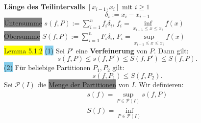 \documentclass[landscape, 10pt]{article}
\begin{document}
\begin{multicols}{3}
              \textbf{Länge des Teilintervalls} 
                     \textcolor{NavyBlue}{
                     $[x_{i-1},x_i]$} mit
                     \textcolor{NavyBlue}{
                     $i\geqslant1$}
                     \begin{equation*}
                            \delta_i:=x_i-x_{i-1}
                     \end{equation*}
              \colorbox{gray}{Untersumme} 
                     \textcolor{NavyBlue}{
                     $s(f,P):=\sum_{i=1}^nf_i\delta_i,\,
                     f_i=\inf\limits_{x_{i-1}
                     \leqslant x\leqslant x_i}f(x)$}\\ 
              \colorbox{gray}{Obersumme} 
                     \textcolor{NavyBlue}{$S(f,P)
                     :=\sum_{i=1}^nF_i\delta_i,\, 
                     F_i=\sup\limits_{x_{i-1}
                     \leqslant x\leqslant x_i}f(x)$}\\
              \colorbox{yellow}{Lemma 5.1.2} 
                     \colorbox{SkyBlue}{(1)} 
                            Sei \textcolor{NavyBlue}{$P'$}
                            eine \textbf{Verfeinerung} von 
                            \textcolor{NavyBlue}{$P$}. 
                            Dann gilt: 
                            \begin{equation*}
                                   s(f,P)\leqslant s(f,P')
                                   \leqslant S(f,P')
                                   \leqslant S(f,P).
                            \end{equation*}
                     \colorbox{SkyBlue}{(2)} 
                            Für beliebige Partitionen 
                            \textcolor{NavyBlue}{$P_1,P_2$}
                            gilt: 
                            \begin{equation*}
                                   s(f,P_1)
                                   \leqslant S(f,P_2).
                            \end{equation*}
              Sei \textcolor{NavyBlue}{$\mathcal{P}(I)$} 
                     die \colorbox{gray}{Menge der Partitionen} 
                     von \textcolor{NavyBlue}{$I$}. 
                     Wir definieren: 
                     \begin{align*}
                            s(f)=\sup
                            \limits_{P\in\mathcal{P}(I)}
                            s(f,P)\\
                            S(f)=\inf
                            \limits_{P\in\mathcal{P}(I)}

\end{align*}
\end{multicols}
\end{document}
